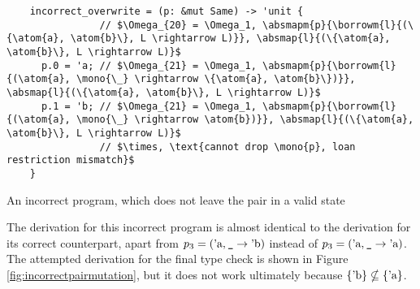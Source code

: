 \documentclass[12pt,twoside]{report}
\begin{document}
\begin{listing}
  \begin{verbatim}
    incorrect_overwrite = (p: &mut Same) -> 'unit {
                // $\Omega_{20} = \Omega_1, \absmapm{p}{\borrowm{l}{(\{\atom{a}, \atom{b}\}, L \rightarrow L)}}, \absmap{l}{(\{\atom{a}, \atom{b}\}, L \rightarrow L)}$
      p.0 = 'a; // $\Omega_{21} = \Omega_1, \absmapm{p}{\borrowm{l}{(\atom{a}, \mono{\_} \rightarrow \{\atom{a}, \atom{b}\})}}, \absmap{l}{(\{\atom{a}, \atom{b}\}, L \rightarrow L)}$
      p.1 = 'b; // $\Omega_{21} = \Omega_1, \absmapm{p}{\borrowm{l}{(\atom{a}, \mono{\_} \rightarrow \atom{b})}}, \absmap{l}{(\{\atom{a}, \atom{b}\}, L \rightarrow L)}$
                // $\times, \text{cannot drop \mono{p}, loan restriction mismatch}$ 
    }   
  \end{verbatim}
  \caption{An incorrect program, which does not leave the pair in a valid state}
  \label{listing:incorrectmutation}
\end{listing}

The derivation for this incorrect program is almost identical to the derivation for its correct counterpart, apart from $p_3 = (\text{'a}, \text{\texttt{\_}} \rightarrow \text{'b})$ instead of $p_3 = (\text{'a}, \text{\texttt{\_}} \rightarrow \text{'a})$. The attempted derivation for the final type check is shown in Figure \ref{fig:incorrectpairmutation}, but it does not work ultimately because $\{\text{'b}\} \nsubseteq \{\text{'a}\}$.
\end{document}
